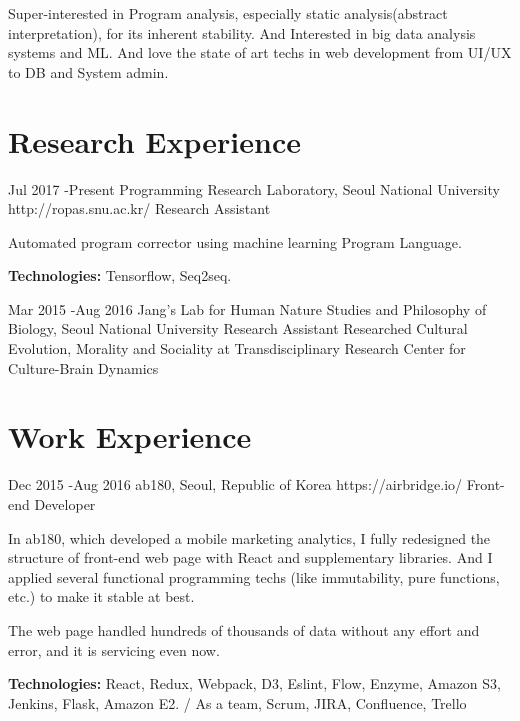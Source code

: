 \documentclass[10pt]{article} %
\begin{document}
Super-interested in Program analysis, especially static analysis(abstract interpretation), for its inherent stability. And Interested in big data analysis systems and ML. And love the state of art techs in web development from UI/UX to DB and System admin.


\section{Research Experience}

\job
{Jul 2017 -}{Present}
{Programming Research Laboratory, Seoul National University}
{http://ropas.snu.ac.kr/}
{Research Assistant}
{Automated program corrector using machine learning Program Language.\\
\rule{0mm}{5mm}\textbf{Technologies:} Tensorflow, Seq2seq.}


\job
{Mar 2015 -}{Aug 2016}
{Jang’s Lab for Human Nature Studies and Philosophy of Biology, Seoul National University}
{}
{Research Assistant}
{Researched Cultural Evolution, Morality and Sociality at Transdisciplinary Research Center for Culture-Brain Dynamics}


\section{Work Experience}

\job
{Dec 2015 -}{Aug 2016}
{ab180, Seoul, Republic of Korea}
{https://airbridge.io/}
{Front-end Developer}
{In ab180, which developed a mobile marketing analytics, I fully redesigned the structure of front-end web page with React and supplementary libraries. And I applied several functional programming techs (like immutability, pure functions, etc.) to make it stable at best.

The web page handled hundreds of thousands of data without any effort and error, and it is servicing even now.\\
\rule{0mm}{5mm}\textbf{Technologies:} React, Redux, Webpack, D3, Eslint, Flow, Enzyme, Amazon S3, Jenkins, Flask, Amazon E2. / As a team, Scrum, JIRA, Confluence, Trello}
\end{document}

